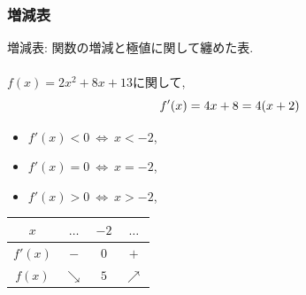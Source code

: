 


\begin{frame}
\frametitle{増減表}

増減表: 関数の増減と極値に関して纏めた表.\\
\ \\

$f(x)=2x^2+8x+13$に関して, 
$$
f'(x)=4x+8=4(x+2) \vspace{-4.5mm}
$$
\begin{itemize}
\item $f'(x)<0 \ \Leftrightarrow \ x<-2$, 
\item $f'(x)=0 \ \Leftrightarrow \ x=-2$, 
\item $f'(x)>0 \ \Leftrightarrow \ x>-2$, 
\end{itemize}

\begin{table}[htb]
\begin{center}
\begin{tabular}{c|c|c|c}
$x$ & $\dots$ & $-2$ & $\dots$ \\ \hline 
$f'(x)$   & $-$ & 0  & $+$   \\ \hline 
$f(x)$   & $\searrow$ & $5$ &  $\nearrow$  
  \end{tabular}
  \end{center}
\end{table}

\end{frame}







